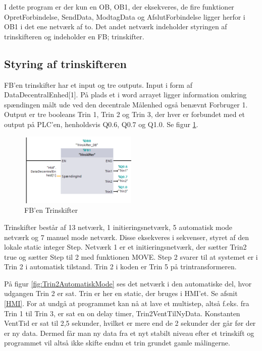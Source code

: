 I dette program er der kun en OB, OB1, der eksekveres, de fire funktioner OpretForbindelse, SendData, ModtagData og AfslutForbindelse ligger herfor i OB1 i det ene netværk af to. Det andet netværk indeholder styringen af trinskifteren og indeholder en FB; trinskifter.

\subsection{Styring af trinskifteren}

FB'en trinskifter har et input og tre outputs. Input i form af DataDecentralEnhed[1]. På plads et i word arrayet ligger information omkring spændingen målt ude ved den decentrale Målenhed også benævnt Forbruger 1. Output er tre booleans Trin 1, Trin 2 og Trin 3, der hver er forbundet med et output på PLC'en, henholdsvis Q0.6, Q0.7 og Q1.0. Se figur \ref{fig:PLCTrinskifter}.

\begin{figure}[H] %
	\centering
	\includegraphics[width=0.5\textwidth]{Figure/PLCTrinskifter}
	\caption{FB'en Trinskifter}
	\label{fig:PLCTrinskifter}
\end{figure}

Trinskifter består af 13 netværk, 1 initieringsnetværk, 5 automatisk mode netværk og 7 manuel mode netværk. Disse eksekveres i sekvenser, styret af den lokale static integer Step. Netværk 1 er et initieringsnetværk, der sætter Trin2 true og sætter Step til 2 med funktionen MOVE. Step 2 svarer til at systemet er i Trin 2 i automatisk tilstand. Trin 2 i koden er Trin 5 på trintransformeren.

På figur \ref{fig:Trin2AutomatiskMode} ses det netværk i den automatiske del, hvor udgangen Trin 2 er sat. Trin er her en static, der bruges i HMI'et. Se afsnit \ref{HMI}. For at undgå at programmet kan nå at lave et multistep, altså f.eks. fra Trin 1 til Trin 3, er sat en on delay timer, Trin2VentTilNyData. Konstanten VentTid er sat til 2,5 sekunder, hvilket er mere end de 2 sekunder der går før der er ny data. Dermed får man ny data fra et nyt stabilt niveau efter et trinskift og programmet vil altså ikke skifte endnu et trin grundet gamle målingerne.

